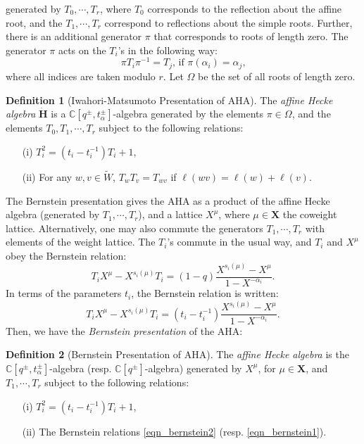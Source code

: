\documentclass[a4paper]{report}
\theoremstyle{theorem}
\theoremstyle{definition}
\newtheorem{definition}{Definition}
\theoremstyle{remark}
\theoremstyle{proposition}
\theoremstyle{conjecture}
\theoremstyle{lemma}
\theoremstyle{corollary}
\theoremstyle{exercise}
\theoremstyle{example}
\newcommand{\C}{\mathbb{C}}
\begin{document}
  generated by $T_0,\cdots,T_r$, where $T_0$ corresponds to the reflection about the affine root, 
  and the $T_1,\cdots,T_r$ correspond to reflections about the simple roots. Further, there is 
  an additional generator $\pi$ that corresponds to roots of length zero. The generator 
  $\pi$ acts on the $T_i$'s in the following way:
  $$\text{$\pi T_i \pi^{-1} = T_j$, if $\pi(\alpha_i)=\alpha_j$,}$$
  where all indices are taken modulo $r$. Let $\Omega$ be the set of all 
  roots of length zero.
  \begin{definition}[Iwahori-Matsumoto Presentation of AHA]
      The \emph{affine Hecke algebra} $\mathbf{\dot{H}}$ is a 
      $\C[q^\pm,t_\alpha^\pm]$-algebra generated by 
      the elements $\pi \in \Omega$, and the elements $T_0,T_1,\cdots,T_r$
      subject to the following relations:
      \begin{itemize}
          \item[(i)] $T_i^2 = (t_i-t_i^{-1}) T_i + 1$,
          \item[(ii)] For any $w, v \in \widetilde{W}$, 
              $T_w T_{v} = T_{wv}$ if $\ell(wv) = \ell(w) + \ell(v)$.
      \end{itemize}
  \end{definition}
  The Bernstein presentation gives the AHA as a product of the affine Hecke algebra (generated by 
  $T_1,\cdots,T_r$), and a lattice $X^\mu$, where $\mu \in \mathbf{X}$ the coweight lattice. Alternatively, one may also commute the generators $T_1,\cdots,T_r$ with elements of the weight lattice. 
  The $T_i$'s 
  commute in the usual way, and $T_i$ and $X^\mu$ obey the Bernstein relation:
  \begin{equation}\label{eqn_bernstein1}
      T_iX^{\mu} - X^{s_i(\mu)}T_i = (1-q)\frac{X^{s_i(\mu)} - X^{\mu}}{1-X^{-\alpha_i}}.
  \end{equation}
  In terms of the parameters $t_i$, the Bernstein relation is written:
  \begin{equation}\label{eqn_bernstein2}
      T_iX^{\mu} - X^{s_i(\mu)}T_i = (t_i-t_i^{-1})\frac{X^{s_i(\mu)} - X^{\mu}}{1-X^{-\alpha_i}}.
  \end{equation}
  Then, we have the \emph{Bernstein presentation} of the AHA:
  \begin{definition}[Bernstein Presentation of AHA]
      The \emph{affine Hecke algebra} is the $\C[q^\pm, t_\alpha^\pm]$-algebra 
      (resp. $\C[q^\pm]$-algebra)
      generated by 
      $X^{\mu}$, for $\mu \in \mathbf{X}$, and $T_1,\cdots,T_r$ 
      subject to the following relations:
      \begin{itemize}
          \item[(i)] $T_i^2 = (t_i-t_i^{-1})T_i + 1$,
          \item[(ii)] The Bernstein relations \eqref{eqn_bernstein2} (resp. \eqref{eqn_bernstein1}).
      \end{itemize}
  \end{definition}
\end{document}
